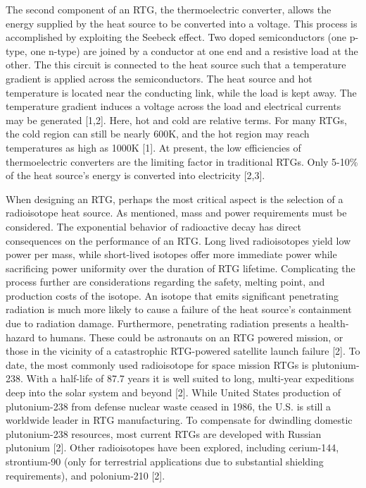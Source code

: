 \documentclass{report}
\newcommand{\tab}{\-\hspace{1cm}}
\begin{document}
\begin{multicols}{2}
\tab The second component of an RTG, the thermoelectric converter, allows the energy supplied by the heat source to be converted into a voltage. This process is accomplished by exploiting the Seebeck effect. Two doped semiconductors (one p-type, one n-type) are joined by a conductor at one end and a resistive load at the other. The this circuit is connected to the heat source such that a temperature gradient is applied across the semiconductors. The heat source and hot temperature is located near the conducting link, while the load is kept away. The temperature gradient induces a voltage across the load and electrical currents may be generated [1,2]. Here, hot and cold are relative terms. For many RTGs, the cold region can still be nearly 600K, and the hot region may reach temperatures as high as 1000K [1]. At present, the low efficiencies of thermoelectric converters are the limiting factor in traditional RTGs. Only 5-10\% of the heat source's energy is converted into electricity [2,3].

\tab When designing an RTG, perhaps the most critical aspect is the selection of a radioisotope heat source. As mentioned, mass and power requirements must be considered. The exponential behavior of radioactive decay has direct consequences on the performance of an RTG. Long lived radioisotopes yield low power per mass, while short-lived isotopes offer more immediate power while sacrificing power uniformity over the duration of RTG lifetime. Complicating the process further are considerations regarding the safety, melting point, and production costs of the isotope. An isotope that emits significant penetrating radiation is much more likely to cause a failure of the heat source's containment due to radiation damage. Furthermore, penetrating radiation presents a health-hazard to humans. These could be astronauts on an RTG powered mission, or those in the vicinity of a catastrophic RTG-powered satellite launch failure [2]. To date, the most commonly used radioisotope for space mission RTGs is plutonium-238. With a half-life of 87.7 years it is well suited to long, multi-year expeditions deep into the solar system and beyond [2]. While United States production of plutonium-238 from defense nuclear waste ceased in 1986, the U.S. is still a worldwide leader in RTG manufacturing. To compensate for dwindling domestic plutonium-238 resources, most current RTGs are developed with Russian plutonium [2]. Other radioisotopes have been explored, including cerium-144, strontium-90 (only for terrestrial applications due to substantial shielding requirements), and polonium-210 [2].


\end{multicols}
\end{document}
